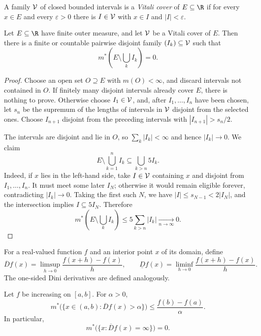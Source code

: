 \begin{de}
A family $\mathcal{V}$ of closed bounded intervals is a \emph{Vitali cover} of $E\subseteq\R$ if for every $x\in E$ and every $\varepsilon>0$ there is $I\in\mathcal{V}$ with $x\in I$ and $|I|<\varepsilon$.
\end{de}

\begin{thm}
Let $E\subseteq\R$ have finite outer measure, and let $\mathcal{V}$ be a Vitali cover of $E$. Then there is a finite or countable pairwise disjoint family $(I_k)\subseteq\mathcal{V}$ such that
\[
m^*\left(E\setminus\bigcup_k I_k\right)=0.
\]
\end{thm}

\begin{proof}
Choose an open set $O\supseteq E$ with $m(O)<\infty$, and discard intervals not contained in $O$. If finitely many disjoint intervals already cover $E$, there is nothing to prove. Otherwise choose $I_1\in\mathcal{V}$, and, after $I_1,\dots,I_n$ have been chosen, let $s_n$ be the supremum of the lengths of intervals in $\mathcal{V}$ disjoint from the selected ones. Choose $I_{n+1}$ disjoint from the preceding intervals with $|I_{n+1}|>s_n/2$.

The intervals are disjoint and lie in $O$, so $\sum_k|I_k|<\infty$ and hence $|I_k|\to0$. We claim
\[
E\setminus\bigcup_{k=1}^n I_k\subseteq\bigcup_{k>n}5I_k.
\]
Indeed, if $x$ lies in the left-hand side, take $I\in\mathcal{V}$ containing $x$ and disjoint from $I_1,\dots,I_n$. It must meet some later $I_N$; otherwise it would remain eligible forever, contradicting $|I_k|\to0$. Taking the first such $N$, we have $|I|\leq s_{N-1}<2|I_N|$, and the intersection implies $I\subseteq5I_N$. Therefore
\[
m^*\left(E\setminus\bigcup_k I_k\right)
 \leq 5\sum_{k>n}|I_k|\xrightarrow[n\to\infty]{}0.
\]
\end{proof}

\begin{de}
For a real-valued function $f$ and an interior point $x$ of its domain, define
\[
\overline D f(x)=\limsup_{h\to0}\frac{f(x+h)-f(x)}h,
\qquad
\underline D f(x)=\liminf_{h\to0}\frac{f(x+h)-f(x)}h.
\]
The one-sided Dini derivatives are defined analogously.
\end{de}

\begin{lem}
Let $f$ be increasing on $[a,b]$. For $\alpha>0$,
\[
m^*\bigl(\{x\in(a,b):\overline D f(x)>\alpha\}\bigr)
 \leq \frac{f(b)-f(a)}{\alpha}.
\]
In particular,
\[
m^*\bigl(\{x:\overline D f(x)=\infty\}\bigr)=0.
\]
\end{lem}

